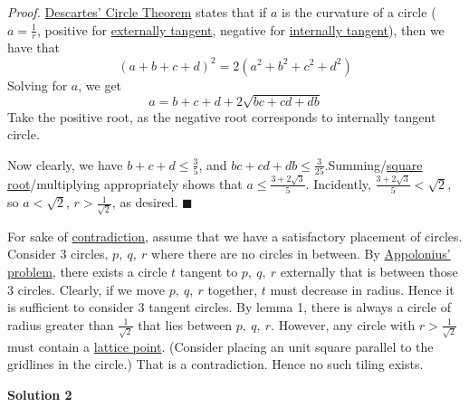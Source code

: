\begin{enumerate}
 \textit{Proof.} \href{https://artofproblemsolving.com/wiki/index.php?title=Descartes\%27\_Circle\_Theorem&action=edit&redlink=1}{Descartes' Circle Theorem} states that if $a$ is the curvature of a circle ($a=\frac 1{r}$, positive for \href{https://artofproblemsolving.com/wiki/index.php?title=Externally\_tangent}{externally tangent}, negative for \href{https://artofproblemsolving.com/wiki/index.php?title=Internally\_tangent}{internally tangent}), then we have that 
 \[(a+b+c+d)^2=2(a^2+b^2+c^2+d^2)\]Solving for $a$, we get 
 \[a=b+c+d+2 \sqrt{bc+cd+db}\]Take the positive root, as the negative root corresponds to internally tangent circle.

 Now clearly, we have $b+c+d \le \frac 35$, and $bc+cd+db\le \frac 3{25}$.Summing/\href{https://artofproblemsolving.com/wiki/index.php?title=Square\_root}{square root}/multiplying appropriately shows that $a \le \frac{3 + 2 \sqrt{3}}5$. Incidently, $\frac{3 + 2\sqrt{3}}5 < \sqrt{2}$, so $a< \sqrt{2}$, $r > \frac 1{\sqrt{2}}$, as desired. $\blacksquare$

 For sake of \href{https://artofproblemsolving.com/wiki/index.php?title=Contradiction}{contradiction}, assume that we have a satisfactory placement of circles. Consider 3 circles, $p,\ q,\ r$ where there are no circles in between. By \href{https://artofproblemsolving.com/wiki/index.php?title=Appolonius\%27\_problem&action=edit&redlink=1}{Appolonius' problem}, there exists a circle $t$ tangent to $p,\ q,\ r$ externally that is between those 3 circles. Clearly, if we move $p,\ q,\ r$ together, $t$ must decrease in radius. Hence it is sufficient to consider 3 tangent circles. By lemma 1, there is always a circle of radius greater than $\frac{1}{\sqrt{2}}$ that lies between $p,\ q,\ r$. However, any circle with $r>\frac 1{\sqrt{2}}$ must contain a \href{https://artofproblemsolving.com/wiki/index.php?title=Lattice\_point}{lattice point}. (Consider placing an unit square parallel to the gridlines in the circle.) That is a contradiction. Hence no such tiling exists.

 



\textbf{Solution 2}


\end{enumerate}
